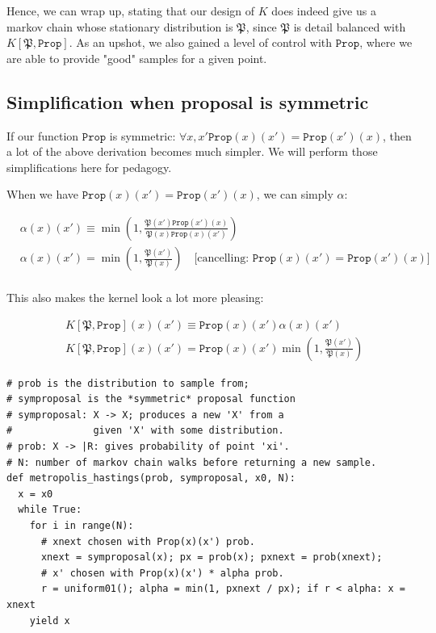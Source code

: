 \documentclass[titlepage]{article}
\renewcommand{\P}{\mathfrak{P}}
\newcommand{\Prop}{\texttt{Prop}}
\begin{document}
Hence, we can wrap up, stating that our design of $K$ does indeed give us a
markov chain whose stationary distribution is $\P$, since $\P$ is detail
balanced with $K[\P, \Prop]$. As an upshot, we also gained a level of control
with $\Prop$, where we are able to provide "good" samples for a given point.

\subsection{Simplification when proposal is symmetric}
If our function $\Prop$ is symmetric: $\forall x, x' \Prop(x)(x') = \Prop(x')(x)$,
then a lot of the above derivation becomes much simpler. We will perform those
simplifications here for pedagogy.


When we have $\Prop(x)(x') = \Prop(x')(x)$, we can simply $\alpha$:

\begin{align*}
&\alpha(x)(x') \equiv   \min\left(1, \frac{\P(x')\Prop(x')(x)}{\P(x)\Prop(x)(x')} \right) \\
&\alpha(x)(x') = \min\left(1, \frac{\P(x')}{\P(x)} \right) \quad \text{[cancelling: $\Prop(x)(x') = \Prop(x')(x)$]}\\ 
\end{align*}

This also makes the kernel look a lot more pleasing:

\begin{align*}
&K[\P, \Prop](x)(x') \equiv \Prop(x)(x') \alpha(x)(x') \\
&K[\P, \Prop](x)(x') = \Prop(x)(x') \min\left(1, \frac{\P(x')}{\P(x)} \right) 
\end{align*}

\newpage

{\footnotesize
\begin{verbatim}
# prob is the distribution to sample from;
# symproposal is the *symmetric* proposal function
# symproposal: X -> X; produces a new 'X' from a 
#              given 'X' with some distribution.
# prob: X -> |R: gives probability of point 'xi'.
# N: number of markov chain walks before returning a new sample.
def metropolis_hastings(prob, symproposal, x0, N):
  x = x0
  while True:
    for i in range(N):
      # xnext chosen with Prop(x)(x') prob.
      xnext = symproposal(x); px = prob(x); pxnext = prob(xnext);
      # x' chosen with Prop(x)(x') * alpha prob.
      r = uniform01(); alpha = min(1, pxnext / px); if r < alpha: x = xnext
    yield x
\end{verbatim}
}
\end{document}
